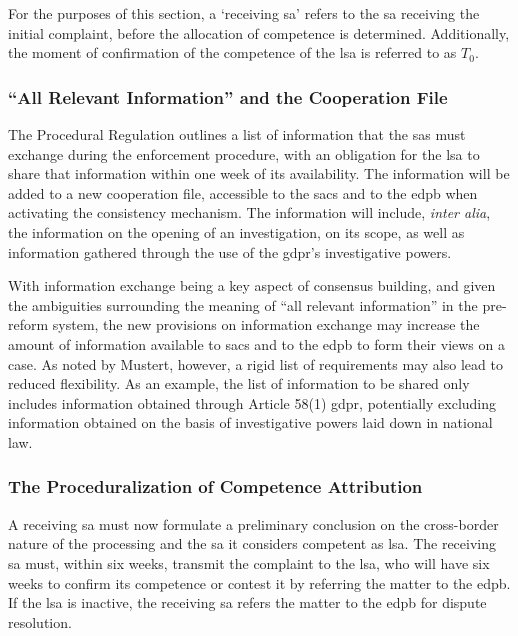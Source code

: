 For the purposes of this section, a `receiving \gls{sa}' refers to the \gls{sa} receiving the initial complaint, before the allocation of competence is determined.
Additionally, the moment of confirmation of the competence of the \gls{lsa} is referred to as $T_0$.

\subsubsection{``All Relevant Information'' and the Cooperation File}
\label{sec:ch3-cooperation-file}

The Procedural Regulation outlines a list of information that the \glspl{sa} must exchange during the enforcement procedure, with an obligation for the \gls{lsa} to share that information within one week of its availability.\autocite[9]{ProceduralRegulation}
The information will be added to a new cooperation file, accessible to the \glspl{sac} and to the \gls{edpb} when activating the consistency mechanism.\autocite[26(2)]{ProceduralRegulation}
The information will include, \emph{inter alia}, the information on the opening of an investigation, on its scope, as well as information gathered through the use of the \gls{gdpr}'s investigative powers.\autocites[26]{ProceduralRegulation}[504]{mustertProceduralisingEnforcement2026}

With information exchange being a key aspect of consensus building, and given the ambiguities surrounding the meaning of ``all relevant information'' in the pre-reform system, the new provisions on information exchange may increase the amount of information available to \glspl{sac} and to the \gls{edpb} to form their views on a case.
As noted by Mustert, however, a rigid list of requirements may also lead to reduced flexibility. 
As an example, the list of information to be shared only includes information obtained through Article 58(1) \gls{gdpr}, potentially excluding information obtained on the basis of investigative powers laid down in national law.\autocite[504]{mustertProceduralisingEnforcement2026}

\subsubsection{The Proceduralization of Competence Attribution}
\label{sec:ch3-competence-attribution}

A receiving \gls{sa} must now formulate a preliminary conclusion on the cross-border nature of the processing and the \gls{sa} it considers competent as \gls{lsa}.\autocite[4(4)]{ProceduralRegulation}
The receiving \gls{sa} must, within six weeks, transmit the complaint to the \gls{lsa},\autocite[4(5)]{ProceduralRegulation} who will have six weeks to confirm its competence or contest it by referring the matter to the \gls{edpb}.\autocite[4(6)]{ProceduralRegulation}
If the \gls{lsa} is inactive, the receiving \gls{sa} refers the matter to the \gls{edpb} for dispute resolution.\autocite[4(6)]{ProceduralRegulation}

